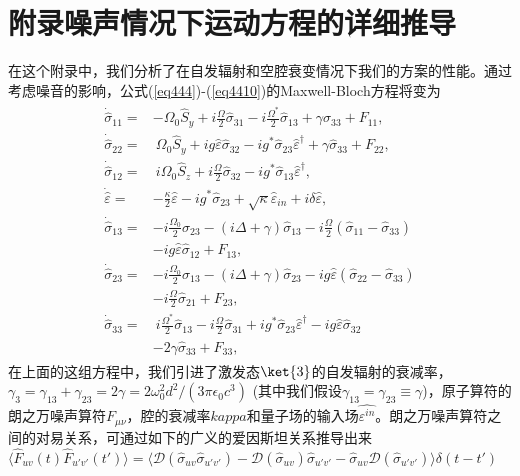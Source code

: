 
\chapter[附录]{附录\quad 噪声情况下运动方程的详细推导}\label{appendix}
\vbox{}
\vbox{}
在这个附录中，我们分析了在自发辐射和空腔衰变情况下我们的方案的性能。通过考虑噪音的影响，公式(\ref{eq444})-(\ref{eq4410})的Maxwell-Bloch方程将变为\cite{PhysRevA.76.033804}
\begin{align} \label{a1}
	\begin{split}
\dot {\hat \sigma}_{11}  =& -\Omega_0 \hat S_y + i   \frac \Omega2{ \hat \sigma}_{31} - i \frac{ \Omega^\ast}{2}{ \hat \sigma}_{13} + \gamma{ \hat \sigma}_{33}+ F_{11},\\
\dot {\hat \sigma}_{22} =&~\Omega_0 \hat S_y + i g \hat \varepsilon{ \hat \sigma}_{32} - ig^\ast{ \hat \sigma}_{23} \hat \varepsilon^\dag + \gamma{ \hat \sigma}_{33}+ F_{22},\\
\dot {\hat \sigma}_{12} =& ~ i  \Omega_0  \hat S_z + i   \frac{\Omega}{2}{ \hat \sigma}_{32} - ig^\ast{ \hat \sigma}_{13} \hat \varepsilon^\dag,\\
\dot {\hat\varepsilon} =& - \frac\kappa2\hat\varepsilon - ig^\ast{\hat\sigma}_{23} + \sqrt\kappa{\hat\varepsilon}_{in}+i\delta\hat\varepsilon,\\
\dot {\hat \sigma}_{13} =& -i\frac{ \Omega_0}2 \sigma_{23} - (i  \Delta + \gamma){ \hat \sigma}_{13}-i \frac\Omega2({ \hat \sigma}_{11}-{ \hat \sigma}_{33})\\
&- ig\hat\varepsilon{\hat\sigma}_{12} + F_{13},\\
\dot {\hat \sigma}_{23} =& -i\frac{ \Omega_0}2 \sigma_{13} - (i\Delta+\gamma){\hat\sigma}_{23} - ig\hat\varepsilon({\hat\sigma}_{22}-{\hat\sigma}_{33})\\
&- i\frac\Omega2{\hat\sigma}_{21}+F_{23},\\
\dot {\hat \sigma}_{33} =&~i\frac{\Omega^\ast}2{\hat\sigma}_{13} - i\frac\Omega2{\hat\sigma}_{31}+ig^\ast{\hat\sigma}_{23}\hat\varepsilon^\dag
- ig\hat\varepsilon{\hat\sigma}_{32} \\
&- 2\gamma{\hat\sigma}_{33}+F_{33},
\end{split}
\end{align}
在上面的这组方程中，我们引进了激发态$\ket{3}$的自发辐射的衰减率，$\gamma_3=\gamma_{13}+\gamma_{23}=2\gamma=2\omega_0^2d^2/(3\pi\epsilon_0c^3)$ \cite{fox2006quantum} (其中我们假设$\gamma_{13}=\gamma_{23}\equiv \gamma$)，原子算符的朗之万噪声算符$F_{\mu\nu}$，腔的衰减率$kappa$和量子场的输入场$\hat{\varepsilon^{in}}$。朗之万噪声算符之间的对易关系，可通过如下的广义的爱因斯坦关系\cite{PhysRevA.76.033804,JOB}推导出来$\langle \hat F_{uv}(t)\hat F_{u'v'}(t')\rangle=\langle\mathcal {D}(\hat\sigma_{uv}\hat\sigma_{u'v'})-\mathcal {D}(\hat\sigma_{uv})\hat\sigma_{u'v'}-\hat\sigma_{uv}\mathcal {D}(\hat\sigma_{u'v'})\rangle\delta(t-t')$
